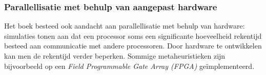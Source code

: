 \subsubsection{Parallellisatie met behulp van aangepast hardware}
Het boek besteed ook aandacht aan parallellisatie met behulp van hardware: simulaties tonen aan dat een processor soms een significante hoeveelheid rekentijd besteed aan communicatie met andere processoren. Door hardware te ontwikkelen kan men de rekentijd verder beperken. Sommige metaheuristieken zijn bijvoorbeeld op een \emph{Field Programmable Gate Array (FPGA)} ge\"implementeerd\cite{conf/glvlsi/HaldarNCB00,conf/fpt/GuntschMSDESS02,journals/gpem/Martin01}.